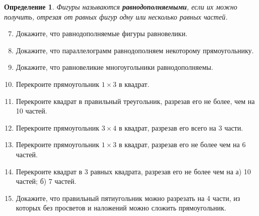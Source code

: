 \documentclass{article}
\newtheorem{definition}{Определение}
\begin{document}
\begin{definition}
	Фигуры называются \textbf{равнодополняемыми}, если их можно получить, отрезая от равных фигур одну или несколько равных частей.
\end{definition}


\begin{enumerate}[label*=\protect\fbox{\arabic{enumi}}]

\setcounter{enumi}{6}
\item Докажите, что равнодополняемые фигуры равновелики.

\item Докажите, что параллелограмм равнодополняем некоторому прямоугольнику.

\item Докажите, что равновеликие многоугольники равнодополняемы.

\item Перекроите прямоугольник $1 \times 3$ в квадрат.

\item Перекроите квадрат в правильный треугольник, разрезав его не более, чем на 10 частей.

\item Перекроите прямоугольник $3\times 4$ в квадрат, разрезав его всего на 3 части.

\item Перекроите прямоугольник $1 \times 3$ в квадрат, разрезав его не более чем на 6 частей.

\item Перекроите квадрат в 3 равных квадрата, разрезав его не более чем на а) 10 частей; б) 7 частей.

\item Докажите, что правильный пятиугольник можно разрезать на 4 части, из которых без просветов и наложений можно сложить прямоугольник.

\end{enumerate}
\end{document}

